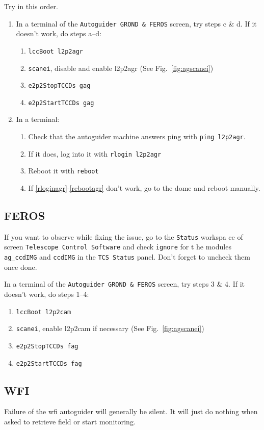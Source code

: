 \documentclass[11pt,fleqn]{book} %
\begin{document}
Try in this order.
\begin{enumerate}
\item In a terminal of the \texttt{Autoguider GROND \& FEROS} screen, try steps c \& d. If it doesn't work, do steps a--d:
\begin{enumerate}
   \item \texttt{lccBoot l2p2agr}
   \item \texttt{scanei}, disable and enable l2p2agr (See Fig.~\ref{fig:agscanei})
   \item \texttt{e2p2StopTCCDs gag}
   \item \texttt{e2p2StartTCCDs gag}
\end{enumerate}
\item In a terminal: 
\begin{enumerate}
  \item Check that the autoguider machine answers ping with \texttt{ping l2p2agr}.
  \item\label{rloginagr} If it does, log into it with \texttt{rlogin l2p2agr}
  \item\label{rebootagr} Reboot it with \texttt{reboot}
  \item If \ref{rloginagr}-\ref{rebootagr} don't work, go to the dome and reboot manually.
\end{enumerate}
\end{enumerate}

\subsection{FEROS}
If you want to observe while fixing the issue, go to the \texttt{Status} workspa
ce of screen \texttt{Telescope Control Software} and check \texttt{ignore} for t
he modules \texttt{ag\_ccdIMG} and \texttt{ccdIMG} in the \texttt{TCS Status}
panel.  Don't forget to uncheck them once done.

In a terminal of the \texttt{Autoguider GROND \& FEROS} screen, try steps 3 \& 4. If it doesn't work, do steps 1--4:
\begin{enumerate}
   \item \texttt{lccBoot l2p2cam}
   \item \texttt{scanei}, enable l2p2cam if necessary (See Fig.~\ref{fig:agscanei})
   \item \texttt{e2p2StopTCCDs fag}
   \item \texttt{e2p2StartTCCDs fag}
\end{enumerate}

\subsection{WFI}
Failure of the \gls{wfi} autoguider will generally be silent.  It will just do nothing when asked to retrieve field or start monitoring.
\end{document}
